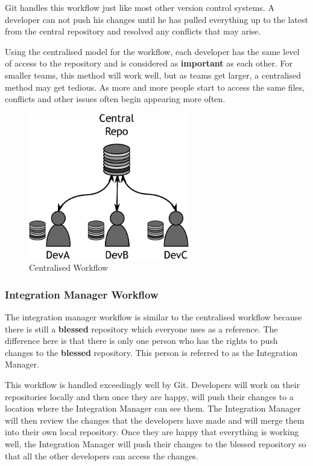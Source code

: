 Git handles this workflow just like most other version control systems.  A developer can not push his changes until he has pulled everything up to the latest from the central repository and resolved any conflicts that may arise.

Using the centralised model for the workflow, each developer has the same level of access to the repository and is considered as \textbf{important} as each other.  For smaller teams, this method will work well, but as teams get larger, a centralised method may get tedious.  As more and more people start to access the same files, conflicts and other issues often begin appearing more often.

\begin{figure}[bt]
	\centering
	\includegraphics[width=7cm]{images/f-w1-d1.pdf}
	\caption{Centralised Workflow}
\end{figure}

\subsubsection{Integration Manager Workflow}
The integration manager workflow is similar to the centralised workflow because there is still a \textbf{blessed} repository which everyone uses as a reference.  The difference here is that there is only one person who has the rights to push changes to the \textbf{blessed} repository.  This person is referred to as the Integration Manager.  

This workflow is handled exceedingly well by Git.  Developers will work on their repositories locally and then once they are happy, will push their changes to a location where the Integration Manager can see them.  The Integration Manager will then review the changes that the developers have made and will merge them into their own local repository.  Once they are happy that everything is working well, the Integration Manager will push their changes to the blessed repository so that all the other developers can access the changes.

